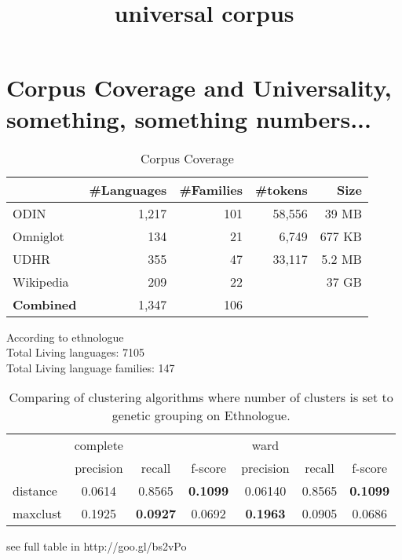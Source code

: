 \documentclass[11pt]{article}
\title{\textbf{universal corpus}}
\date{}
\begin{document}
\maketitle

\section{Corpus Coverage and Universality, something, something numbers...}

\begin{table}[h!]
\centering
    \begin{tabular}{l|rrrr}
    ~         				& \#Languages & \#Families 	&\#tokens		& Size	\\ \hline
    ODIN      				& 1,217      & 101       		& 58,556		& 39 MB		\\
    Omniglot  				& 134        & 21        		&	6,749			& 677 KB	\\
    UDHR      				& 355        & 47        		&	33,117		& 5.2 MB	\\
    Wikipedia 				& 209        & 22       		&						& 37 GB		\\ \hline
    \textbf{Combined}	& 1,347			 & 106 
    \end{tabular}
\caption{Corpus Coverage}
\end{table}

\noindent
According to ethnologue \\
Total Living languages: 7105 \\
Total Living language families: 147 \\

\begin{table}[h!]
    \begin{tabular}{l|ccc|ccc}
    ~        & complete & ~       & ~       & ward    & ~       & ~       \\ \cline{2-7}
    ~        & precision & recall       & f-score       & precision    & recall       & f-score      \\ \hline
    distance & 0.0614   & 0.8565 & \textbf{0.1099} & 0.06140  & 0.8565 & \textbf{0.1099} \\
    maxclust & 0.1925  & \textbf{0.0927} & 0.0692 & \textbf{0.1963} & 0.0905 & 0.0686  \\
    \end{tabular}
\caption{Comparing of clustering algorithms where number of clusters is set to genetic grouping on Ethnologue.}
\end{table}

\noindent
see full table in http://goo.gl/bs2vPo
\end{document}
